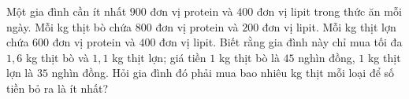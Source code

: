 \begin{bt}%
	Một gia đình cần ít nhất $ 900 $ đơn vị protein và $ 400 $ đơn vị lipit trong thức ăn mỗi ngày. Mỗi kg
	thịt bò chứa $ 800 $ đơn vị protein và $ 200 $ đơn vị lipit. Mỗi kg thịt lợn chứa $ 600 $ đơn vị protein và $ 400 $ đơn vị lipit. Biết rằng gia đình này chỉ mua tối đa $ 1{,}6 $ kg thịt bò và $ 1{,}1 $ kg thịt lợn; giá tiền $ 1 $ kg thịt bò là $ 45 $ nghìn đồng, $ 1 $ kg thịt lợn là $ 35 $ nghìn đồng. Hỏi gia đình đó phải mua bao nhiêu kg thịt mỗi loại để số tiền bỏ ra là ít nhất?
\end{bt}
